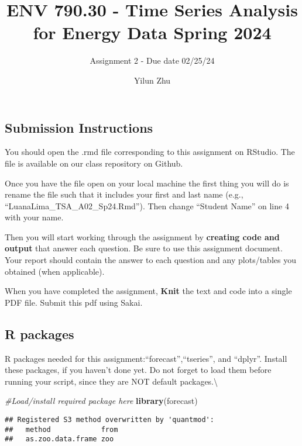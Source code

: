 \documentclass[
]{article}
\title{ENV 790.30 - Time Series Analysis for Energy Data \textbar{}
Spring 2024}
\subtitle{Assignment 2 - Due date 02/25/24}
\author{Yilun Zhu}
\date{}
\newenvironment{Shaded}{\begin{snugshade}}{\end{snugshade}}
\newcommand{\CommentTok}[1]{\textcolor[rgb]{0.56,0.35,0.01}{\textit{#1}}}
\newcommand{\FunctionTok}[1]{\textcolor[rgb]{0.13,0.29,0.53}{\textbf{#1}}}
\newcommand{\NormalTok}[1]{#1}
\begin{document}
\maketitle

\hypertarget{submission-instructions}{%
\subsection{Submission Instructions}\label{submission-instructions}}

You should open the .rmd file corresponding to this assignment on
RStudio. The file is available on our class repository on Github.

Once you have the file open on your local machine the first thing you
will do is rename the file such that it includes your first and last
name (e.g., ``LuanaLima\_TSA\_A02\_Sp24.Rmd''). Then change ``Student
Name'' on line 4 with your name.

Then you will start working through the assignment by \textbf{creating
code and output} that answer each question. Be sure to use this
assignment document. Your report should contain the answer to each
question and any plots/tables you obtained (when applicable).

When you have completed the assignment, \textbf{Knit} the text and code
into a single PDF file. Submit this pdf using Sakai.

\hypertarget{r-packages}{%
\subsection{R packages}\label{r-packages}}

R packages needed for this assignment:``forecast'',``tseries'', and
``dplyr''. Install these packages, if you haven't done yet. Do not
forget to load them before running your script, since they are NOT
default packages.\textbackslash{}

\begin{Shaded}
\begin{Highlighting}[]
\CommentTok{\#Load/install required package here}
\FunctionTok{library}\NormalTok{(forecast)}
\end{Highlighting}
\end{Shaded}

\begin{verbatim}
## Registered S3 method overwritten by 'quantmod':
##   method            from
##   as.zoo.data.frame zoo
\end{verbatim}
\end{document}
